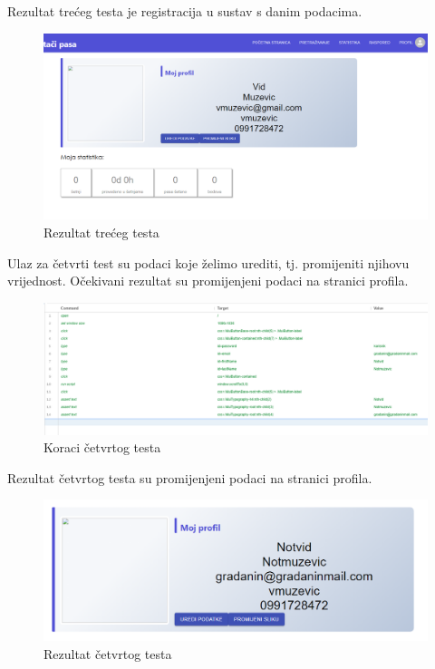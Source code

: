 	\noindent \newline Rezultat trećeg testa je registracija u sustav s danim podacima.

	\begin{figure}[H]
		\includegraphics[width=0.9\linewidth]{slike/front-testovi-6.png}
		\centering
		\caption{Rezultat trećeg testa}
		\label{fig:fronttestovi6}
	\end{figure}

	\eject

	\noindent Ulaz za četvrti test su podaci koje želimo urediti, tj. promijeniti njihovu vrijednost. Očekivani rezultat su promijenjeni podaci na stranici profila.

	\begin{figure}[H]
		\includegraphics[width=\linewidth]{slike/front-testovi-7.png}
		\centering
		\caption{Koraci četvrtog testa}
		\label{fig:fronttestovi7}
	\end{figure}

	\noindent \newline Rezultat četvrtog testa su promijenjeni podaci na stranici profila.

	\begin{figure}[H]
		\includegraphics[width=\linewidth]{slike/front-testovi-8.png}
		\centering
		\caption{Rezultat četvrtog testa}
		\label{fig:fronttestovi8}
	\end{figure}

